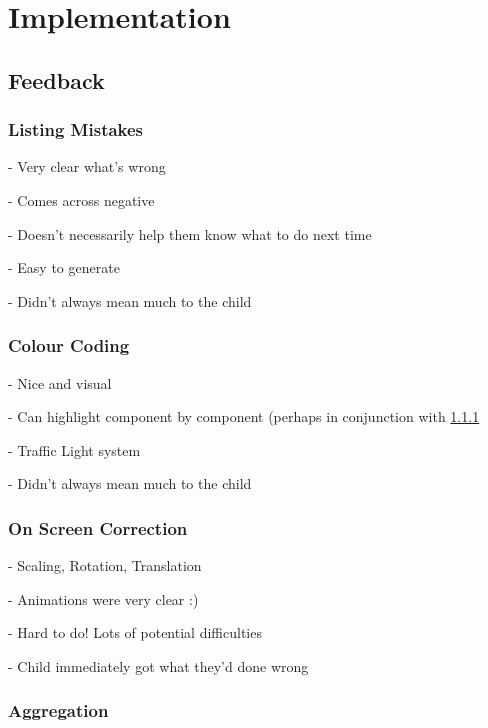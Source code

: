 \chapter{Implementation}




\section{Feedback}\label{sec:implementation-feedback}

\subsection{Listing Mistakes}
\label{sec:feedback-listing}

- Very clear what's wrong

- Comes across negative

- Doesn't necessarily help them know what to do next time

- Easy to generate

- Didn't always mean much to the child

\subsection{Colour Coding}

- Nice and visual

- Can highlight component by component (perhaps in conjunction with \cref{sec:feedback-listing}

- Traffic Light system

- Didn't always mean much to the child

\subsection{On Screen Correction}

- Scaling, Rotation, Translation

- Animations were very clear :)

- Hard to do! Lots of potential difficulties

- Child immediately got what they'd done wrong

\subsection{Aggregation}

